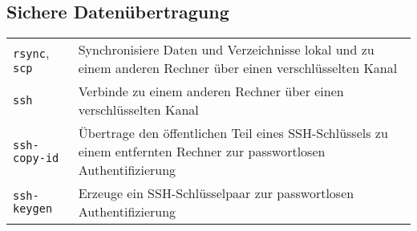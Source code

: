 \documentclass[10pt,a4paper]{article}
\begin{document}
\begin{multicols}{2}
\section{Sichere Datenübertragung}
\begin{tabular}{ p{2.5cm} p{8.5cm} }
  \hline
  \texttt{rsync}, \texttt{scp} & Synchronisiere Daten und Verzeichnisse lokal und zu einem anderen Rechner über einen verschlüsselten Kanal \\
  \rowcolor{Gray}
  \texttt{ssh} & Verbinde zu einem anderen Rechner über einen verschlüsselten Kanal\\
  \texttt{ssh-copy-id} & Übertrage den öffentlichen Teil eines SSH-Schlüssels zu einem entfernten Rechner zur passwortlosen Authentifi\-zierung\\
  \rowcolor{Gray}
  \texttt{ssh-keygen} & Erzeuge ein SSH-Schlüsselpaar zur passwortlosen Authentifizierung\\
  \hline
\end{tabular}


\columnbreak


\end{multicols}
\end{document}

